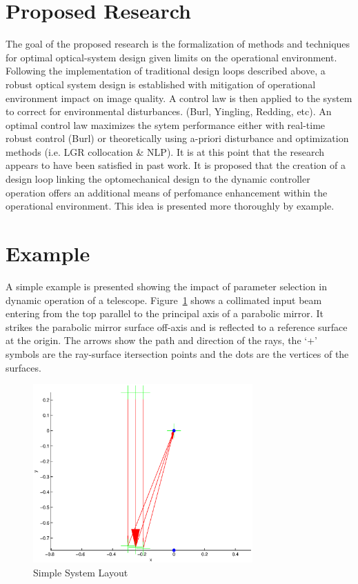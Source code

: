 \documentclass{aiaa-tc}
\begin{document}
\section{Proposed Research}

The goal of the proposed research is the formalization of methods and techniques for optimal optical-system design given limits on the operational environment. Following the implementation of traditional design loops described above, a robust optical system design is established with mitigation of operational environment impact on image quality. A control law is then applied to the system to correct for environmental disturbances. (Burl, Yingling, Redding, etc). An optimal control law maximizes the sytem performance either with real-time robust control (Burl) or theoretically using a-priori disturbance and optimization methods (i.e. LGR collocation \& NLP). It is at this point that the research appears to have been satisfied in past work. It is proposed that the creation of a design loop linking the optomechanical design to the dynamic controller operation offers an additional means of perfomance enhancement within the operational environment. This idea is presented more thoroughly by example.

\section{Example}

A simple example is presented showing the impact of parameter selection in dynamic operation of a telescope. Figure~\ref{simplefig} shows a collimated input beam entering from the top parallel to the principal axis of a parabolic mirror. It strikes the parabolic mirror surface off-axis and is reflected to a reference surface at the origin. The arrows show the path and direction of the rays, the `+' symbols are the ray-surface itersection points and the dots are the vertices of the surfaces.

\begin{figure}	%
 \centering
 \includegraphics[width=0.75\textwidth]{Figures/SimpleLayout}
 \caption{Simple System Layout}
 \label{simplefig}
\end{figure}
\end{document}
